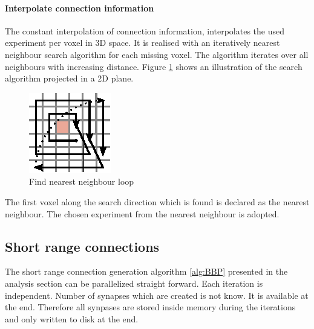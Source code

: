 \paragraph{Interpolate connection information}
\label{par:interpolation}

The constant interpolation of connection information, interpolates the used experiment per voxel in 3D space.
It is realised with an iteratively nearest neighbour search algorithm for each missing voxel.
The algorithm iterates over all neighbours with increasing distance.
Figure \ref{longrange} shows an illustration of the search algorithm
projected in a 2D plane.
\begin{figure}[ht!]
\centering
\includegraphics[scale=2.5]{pictures/longRange_Nearest_parallelAlg.eps}
\caption{Find nearest neighbour loop}
\label{longrange}
\end{figure}
The first voxel along the search direction which is found is declared as the nearest neighbour.
The chosen experiment from the nearest neighbour is adopted.



\subsection{Short range connections}

The short range connection generation algorithm \ref{alg:BBP} presented in the analysis section can be parallelized straight forward.
Each iteration is independent. Number of synapses which are created is not know. It is available
at the end. Therefore all synpases are stored inside memory during the iterations and only written to disk 
at the end.

